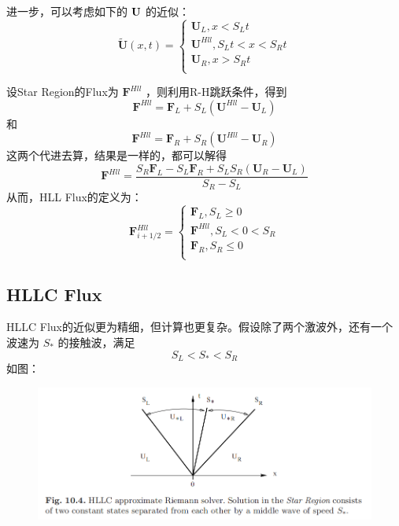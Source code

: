 \documentclass{book}
\begin{document}
\begin{example}
\begin{example}{}{}
\begin{example}
\begin{example}
\begin{example}
\begin{equation}
\end{equation}
进一步，可以考虑如下的 $\bf U$ 的近似：
\begin{equation}
    \mathbf{\tilde{U}}\left( x,t \right) =\begin{cases}
        \mathbf{U}_L,x<S_Lt          \\
        \mathbf{U}^{Hll},S_Lt<x<S_Rt \\
        \mathbf{U}_R,x>S_Rt          \\
    \end{cases}
\end{equation}

设Star Region的Flux为 $\mathbf F^{Hll}$ ，则利用R-H跳跃条件，得到
\begin{equation}
    \mathbf{F}^{Hll}=\mathbf{F}_L+S_L\left( \mathbf{U}^{Hll}-\mathbf{U}_L \right)
\end{equation}
和
\begin{equation}
    \mathbf{F}^{Hll}=\mathbf{F}_R+S_R\left( \mathbf{U}^{Hll}-\mathbf{U}_R \right)
\end{equation}
这两个代进去算，结果是一样的，都可以解得
\begin{equation}
    \displaystyle \mathbf{F}^{Hll}=\frac{S_R\mathbf{F}_L-S_L\mathbf{F}_R+S_LS_R\left( \mathbf{U}_R-\mathbf{U}_L \right)}{S_R-S_L}
\end{equation}
从而，HLL Flux的定义为：
\begin{equation}
    \mathbf{F}_{i+1/2}^{Hll}=\begin{cases}
        \mathbf{F}_L,S_L\ge 0      \\
        \mathbf{F}^{Hll},S_L<0<S_R \\
        \mathbf{F}_R,S_R\le 0      \\
    \end{cases}
\end{equation}





\subsection{HLLC Flux}
HLLC Flux的近似更为精细，但计算也更复杂。假设除了两个激波外，还有一个波速为 $S_*$ 的接触波，满足
\begin{equation}
    S_L<S_*<S_R
\end{equation}
如图：
\begin{figure}[htp]
    \centering
    \label{fig:}
    \includegraphics[width=0.7\linewidth]{fig/HLLC.png}
    \caption{}
\end{figure}



\end{example}
\end{example}
\end{example}
\end{example}
\end{example}
\end{document}
